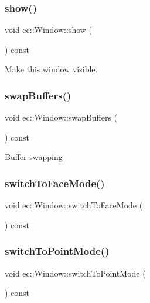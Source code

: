 \subsubsection{\texorpdfstring{show()}{show()}}
{\footnotesize\ttfamily void ec\+::\+Window\+::show (\begin{DoxyParamCaption}{ }\end{DoxyParamCaption}) const}

Make this window visible. \mbox{\label{classec_1_1_window_a92d8c0ad249ed9a069395fac7dbe9455}} 
\subsubsection{\texorpdfstring{swap\+Buffers()}{swapBuffers()}}
{\footnotesize\ttfamily void ec\+::\+Window\+::swap\+Buffers (\begin{DoxyParamCaption}{ }\end{DoxyParamCaption}) const}

Buffer swapping \mbox{\label{classec_1_1_window_a071d133719298221af21bd2c207733b3}} 
\subsubsection{\texorpdfstring{switch\+To\+Face\+Mode()}{switchToFaceMode()}}
{\footnotesize\ttfamily void ec\+::\+Window\+::switch\+To\+Face\+Mode (\begin{DoxyParamCaption}{ }\end{DoxyParamCaption}) const}

\mbox{\label{classec_1_1_window_a633ebdd1e469a3a865f4748b99f9c664}} 
\subsubsection{\texorpdfstring{switch\+To\+Point\+Mode()}{switchToPointMode()}}
{\footnotesize\ttfamily void ec\+::\+Window\+::switch\+To\+Point\+Mode (\begin{DoxyParamCaption}{ }\end{DoxyParamCaption}) const}

